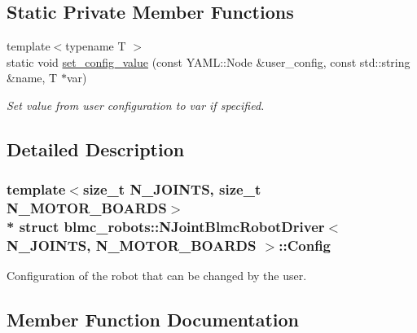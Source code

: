 \subsection*{Static Private Member Functions}
\begin{DoxyCompactItemize}
\item 
{\footnotesize template$<$typename T $>$ }\\static void \hyperlink{structblmc__robots_1_1NJointBlmcRobotDriver_1_1Config_a0d5d8b4ad8693498e56a95e5cbbad9f6}{set\+\_\+config\+\_\+value} (const Y\+A\+M\+L\+::\+Node \&user\+\_\+config, const std\+::string \&name, T $\ast$var)
\begin{DoxyCompactList}\small\item\em Set value from user configuration to var if specified. \end{DoxyCompactList}\end{DoxyCompactItemize}


\subsection{Detailed Description}
\subsubsection*{template$<$size\+\_\+t N\+\_\+\+J\+O\+I\+N\+TS, size\+\_\+t N\+\_\+\+M\+O\+T\+O\+R\+\_\+\+B\+O\+A\+R\+DS$>$\\*
struct blmc\+\_\+robots\+::\+N\+Joint\+Blmc\+Robot\+Driver$<$ N\+\_\+\+J\+O\+I\+N\+T\+S, N\+\_\+\+M\+O\+T\+O\+R\+\_\+\+B\+O\+A\+R\+D\+S $>$\+::\+Config}

Configuration of the robot that can be changed by the user. 

\subsection{Member Function Documentation}
